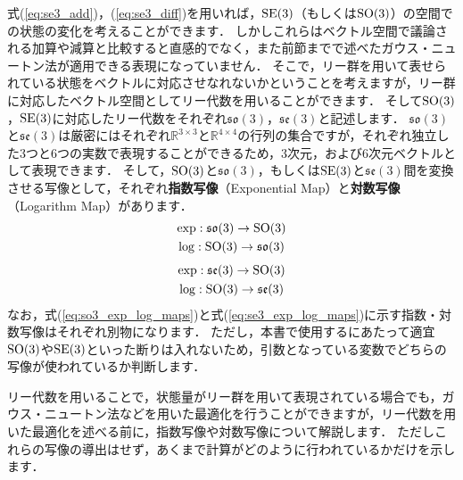 式(\ref{eq:se3_add})，(\ref{eq:se3_diff})を用いれば，${\rm SE}(3)$（もしくは${\rm SO}(3)$）の空間での状態の変化を考えることができます．
しかしこれらはベクトル空間で議論される加算や減算と比較すると直感的でなく，また前節までで述べたガウス・ニュートン法が適用できる表現になっていません．
そこで，リー群を用いて表せられている状態をベクトルに対応させなれないかということを考えますが，リー群に対応したベクトル空間としてリー代数を用いることができます．
そして${\rm SO}(3)$，${\rm SE}(3)$に対応したリー代数をそれぞれ$\mathfrak{so}(3)$，$\mathfrak{se}(3)$と記述します．
$\mathfrak{so}(3)$と$\mathfrak{se}(3)$は厳密にはそれぞれ$\mathbb{R}^{3 \times 3}$と$\mathbb{R}^{4 \times 4}$の行列の集合ですが，それぞれ独立した3つと6つの実数で表現することができるため，3次元，および6次元ベクトルとして表現できます．
そして，${\rm SO}(3)$と$\mathfrak{so}(3)$，もしくは${\rm SE}(3)$と$\mathfrak{se}(3)$間を変換させる写像として，それぞれ{\bf 指数写像}（Exponential Map）と{\bf 対数写像}（Logarithm Map）があります．
%
\begin{align}
  \begin{gathered}
    \exp: \mathfrak{so}(3) \rightarrow {\rm SO}(3) \\
    \log: {\rm SO}(3) \rightarrow \mathfrak{so}(3) \\
  \end{gathered}
  \label{eq:so3_exp_log_maps}
\end{align}
%
\begin{align}
  \begin{gathered}
    \exp: \mathfrak{se}(3) \rightarrow {\rm SO}(3) \\
    \log: {\rm SO}(3) \rightarrow \mathfrak{se}(3) \\
  \end{gathered}
  \label{eq:se3_exp_log_maps}
\end{align}
%
なお，式(\ref{eq:so3_exp_log_maps})と式(\ref{eq:se3_exp_log_maps})に示す指数・対数写像はそれぞれ別物になります．
ただし，本書で使用するにあたって適宜${\rm SO}(3)$や${\rm SE}(3)$といった断りは入れないため，引数となっている変数でどちらの写像が使われているか判断します．

リー代数を用いることで，状態量がリー群を用いて表現されている場合でも，ガウス・ニュートン法などを用いた最適化を行うことができますが，リー代数を用いた最適化を述べる前に，指数写像や対数写像について解説します．
ただしこれらの写像の導出はせず，あくまで計算がどのように行われているかだけを示します．











